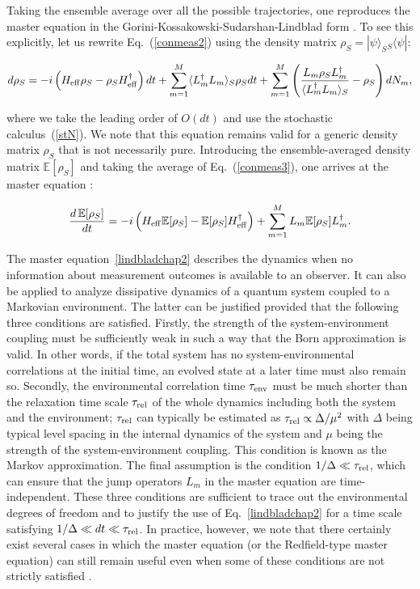 \documentclass{tADP2e}
\theoremstyle{plain}
\newcommand{\eqn}[1]{
\begin{eqnarray}
	#1
\end{eqnarray}
}
\theoremstyle{plain}
\theoremstyle{definition}
\begin{document}
Taking the ensemble average over all the possible trajectories, one reproduces the master equation in the Gorini-Kossakowski-Sudarshan-Lindblad form \cite{GV76,LG76}. To see this explicitly, let us rewrite Eq.~(\ref{conmeas2}) using the density matrix $ {\rho}_{S}=|\psi\rangle_{S}{}_{S}\langle\psi|$: 
\eqn{\label{conmeas3}
d {\rho}_{S}=-i\left( {H}_{{\rm eff}} {\rho}_{S}- {\rho}_{S} {H}_{{\rm eff}}^{\dagger}\right)dt+\sum_{m=1}^{M}\langle {L}_{m}^{\dagger} {L}_{m}\rangle_{S} {\rho}_{S}dt+\sum_{m=1}^{M}\left(\frac{ {L}_{m} {\rho}_{S} {L}_{m}^{\dagger}}{\langle {L}_{m}^{\dagger} {L}_{m}\rangle_{S}}- {\rho}_{S}\right)dN_{m},\nonumber\\
}
where we take the leading order of $O(dt)$ and use the stochastic calculus~(\ref{stN}). We note that this equation remains valid for a generic density matrix $ {\rho}_{S}$ that is not necessarily pure.
Introducing the ensemble-averaged density matrix ${\mathbb{E}[{\rho}_{S}]}$ and taking the average of Eq.~(\ref{conmeas3}), one arrives at the master equation  \cite{GV76,LG76}:
\eqn{\label{lindbladchap2}
\frac{d\,{\mathbb{E}[{\rho}_{S}]}}{dt}=-i\left( {H}_{{\rm eff}}{\mathbb{E}[{\rho}_{S}]}-{\mathbb{E}[{\rho}_{S}]} {H}_{{\rm eff}}^{\dagger}\right)+\sum_{m=1}^{M} {L}_{m}{\mathbb{E}[{\rho}_{S}]} {L}_{m}^{\dagger}.
}

The master equation~\eqref{lindbladchap2} describes the dynamics when no information about measurement outcomes is available to an observer. It  can also be applied to analyze dissipative dynamics of a quantum system coupled to a Markovian environment. The latter can be justified provided that the following three conditions are satisfied. Firstly, the strength of the system-environment coupling must be sufficiently weak in such a way that the Born approximation is valid. In other words, if the total system has no system-environmental correlations at the initial time, an evolved state at a later time must also remain so. Secondly, the environmental correlation time $\tau_{\rm env}$ must be much shorter than the relaxation time scale $\tau_{\rm rel}$ of the whole dynamics including both the system and the environment; $\tau_{\rm rel}$  can typically be estimated as $\tau_{\rm rel}\propto\Delta/\mu^2$ with $\Delta$ being typical level spacing in the internal dynamics of the system and $\mu$ being the strength of the system-environment coupling. This condition is known as the Markov approximation. The final assumption is the  condition $1/\Delta\ll\tau_{\rm rel}$, which can ensure that the jump operators $L_m$ in the master equation are time-independent.  These three conditions are sufficient to trace out the environmental degrees of freedom and to justify the use of Eq.~\eqref{lindbladchap2} for a time scale satisfying $1/\Delta\ll dt\ll\tau_{\rm rel}$. In practice, however, we note that there certainly exist several cases in which the master equation (or the Redfield-type master equation) can still remain useful even when some of these conditions  are not strictly satisfied \cite{PA16,FD19,Cattaneo_2019}. 
\end{document}
